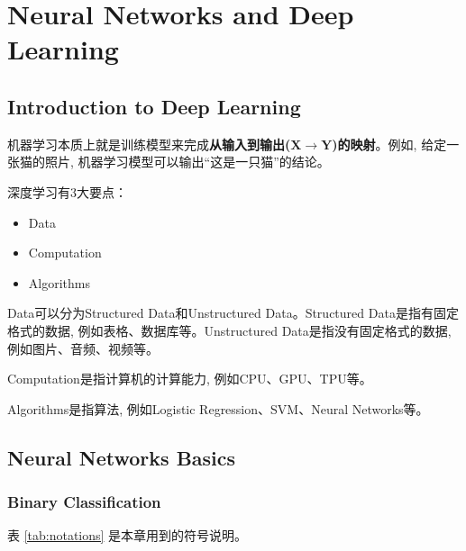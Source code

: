 \chapter{Neural Networks and Deep Learning}

\section{Introduction to Deep Learning}
机器学习本质上就是训练模型来完成\textbf{从输入到输出($\bm{X\to Y}$)的映射}。例如, 给定一张猫的照片, 机器学习模型可以输出``这是一只猫''的结论。

\vspace{0.5\baselineskip} %

深度学习有3大要点：
\begin{itemize}	
	\item Data
	\item Computation
	\item Algorithms
\end{itemize}

Data可以分为Structured Data和Unstructured Data。Structured Data是指有固定格式的数据, 例如表格、数据库等。Unstructured Data是指没有固定格式的数据, 例如图片、音频、视频等。

Computation是指计算机的计算能力, 例如CPU、GPU、TPU等。

Algorithms是指算法, 例如Logistic Regression、SVM、Neural Networks等。

\section{Neural Networks Basics}

\subsection{Binary Classification}

表 \ref{tab:notations} 是本章用到的符号说明。

